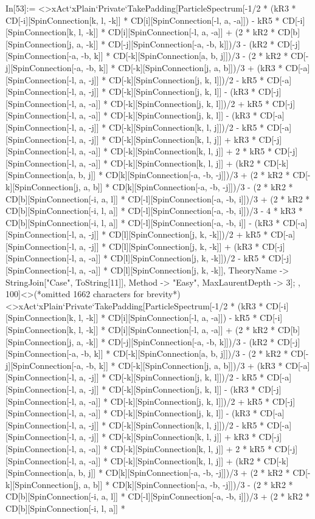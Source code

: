 In[53]:= <>xAct`xPlain`Private`TakePadding[ParticleSpectrum[-1/2 * (kR3 * CD[-i][SpinConnection[k, l, -k]] * CD[i][SpinConnection[-l, a, -a]]) - kR5 * CD[-i][SpinConnection[k, l, -k]] * CD[i][SpinConnection[-l, a, -a]] + (2 * kR2 * CD[b][SpinConnection[j, a, -k]] * CD[-j][SpinConnection[-a, -b, k]])/3 - (kR2 * CD[-j][SpinConnection[-a, -b, k]] * CD[-k][SpinConnection[a, b, j]])/3 - (2 * kR2 * CD[-j][SpinConnection[-a, -b, k]] * CD[-k][SpinConnection[j, a, b]])/3 + (kR3 * CD[-a][SpinConnection[-l, a, -j]] * CD[-k][SpinConnection[j, k, l]])/2 - kR5 * CD[-a][SpinConnection[-l, a, -j]] * CD[-k][SpinConnection[j, k, l]] - (kR3 * CD[-j][SpinConnection[-l, a, -a]] * CD[-k][SpinConnection[j, k, l]])/2 + kR5 * CD[-j][SpinConnection[-l, a, -a]] * CD[-k][SpinConnection[j, k, l]] - (kR3 * CD[-a][SpinConnection[-l, a, -j]] * CD[-k][SpinConnection[k, l, j]])/2 - kR5 * CD[-a][SpinConnection[-l, a, -j]] * CD[-k][SpinConnection[k, l, j]] + kR3 * CD[-j][SpinConnection[-l, a, -a]] * CD[-k][SpinConnection[k, l, j]] + 2 * kR5 * CD[-j][SpinConnection[-l, a, -a]] * CD[-k][SpinConnection[k, l, j]] + (kR2 * CD[-k][SpinConnection[a, b, j]] * CD[k][SpinConnection[-a, -b, -j]])/3 + (2 * kR2 * CD[-k][SpinConnection[j, a, b]] * CD[k][SpinConnection[-a, -b, -j]])/3 - (2 * kR2 * CD[b][SpinConnection[-i, a, l]] * CD[-l][SpinConnection[-a, -b, i]])/3 + (2 * kR2 * CD[b][SpinConnection[-i, l, a]] * CD[-l][SpinConnection[-a, -b, i]])/3 - 4 * kR3 * CD[b][SpinConnection[-i, l, a]] * CD[-l][SpinConnection[-a, -b, i]] - (kR3 * CD[-a][SpinConnection[-l, a, -j]] * CD[l][SpinConnection[j, k, -k]])/2 + kR5 * CD[-a][SpinConnection[-l, a, -j]] * CD[l][SpinConnection[j, k, -k]] + (kR3 * CD[-j][SpinConnection[-l, a, -a]] * CD[l][SpinConnection[j, k, -k]])/2 - kR5 * CD[-j][SpinConnection[-l, a, -a]] * CD[l][SpinConnection[j, k, -k]], TheoryName -> StringJoin["Case", ToString[11]], Method -> "Easy", MaxLaurentDepth -> 3]; , 100]<>(*omitted 1662 characters for brevity*)<>xAct`xPlain`Private`TakePadding[ParticleSpectrum[-1/2 * (kR3 * CD[-i][SpinConnection[k, l, -k]] * CD[i][SpinConnection[-l, a, -a]]) - kR5 * CD[-i][SpinConnection[k, l, -k]] * CD[i][SpinConnection[-l, a, -a]] + (2 * kR2 * CD[b][SpinConnection[j, a, -k]] * CD[-j][SpinConnection[-a, -b, k]])/3 - (kR2 * CD[-j][SpinConnection[-a, -b, k]] * CD[-k][SpinConnection[a, b, j]])/3 - (2 * kR2 * CD[-j][SpinConnection[-a, -b, k]] * CD[-k][SpinConnection[j, a, b]])/3 + (kR3 * CD[-a][SpinConnection[-l, a, -j]] * CD[-k][SpinConnection[j, k, l]])/2 - kR5 * CD[-a][SpinConnection[-l, a, -j]] * CD[-k][SpinConnection[j, k, l]] - (kR3 * CD[-j][SpinConnection[-l, a, -a]] * CD[-k][SpinConnection[j, k, l]])/2 + kR5 * CD[-j][SpinConnection[-l, a, -a]] * CD[-k][SpinConnection[j, k, l]] - (kR3 * CD[-a][SpinConnection[-l, a, -j]] * CD[-k][SpinConnection[k, l, j]])/2 - kR5 * CD[-a][SpinConnection[-l, a, -j]] * CD[-k][SpinConnection[k, l, j]] + kR3 * CD[-j][SpinConnection[-l, a, -a]] * CD[-k][SpinConnection[k, l, j]] + 2 * kR5 * CD[-j][SpinConnection[-l, a, -a]] * CD[-k][SpinConnection[k, l, j]] + (kR2 * CD[-k][SpinConnection[a, b, j]] * CD[k][SpinConnection[-a, -b, -j]])/3 + (2 * kR2 * CD[-k][SpinConnection[j, a, b]] * CD[k][SpinConnection[-a, -b, -j]])/3 - (2 * kR2 * CD[b][SpinConnection[-i, a, l]] * CD[-l][SpinConnection[-a, -b, i]])/3 + (2 * kR2 * CD[b][SpinConnection[-i, l, a]] * 
